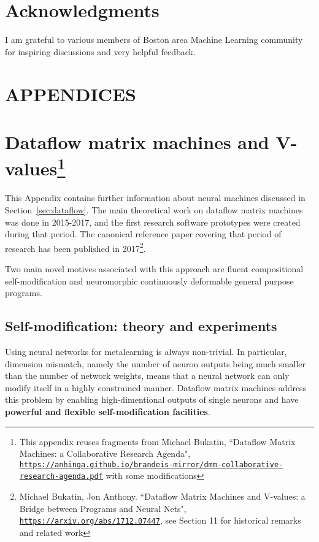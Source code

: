 \documentclass{article}
\begin{document}
\section*{Acknowledgments}

I am grateful to various members of Boston area Machine Learning community for inspiring discussions and very
helpful feedback.

\appendix

\section*{APPENDICES}

\section{Dataflow matrix machines and V-values\texorpdfstring{\protect\footnote{This
appendix reuses fragments from Michael Bukatin, ``Dataflow Matrix Machines: a Collaborative Research Agenda",
\href{https://anhinga.github.io/brandeis-mirror/dmm-collaborative-research-agenda.pdf}{\tt https://anhinga.github.io/brandeis-mirror/dmm-collaborative-research-agenda.pdf} 
with some modifications}}{}}\label{sec:dmms}

This Appendix contains further information about neural machines discussed in Section~\ref{sec:dataflow}.
The main theoretical work on dataflow matrix machines was done in 2015-2017, and the first research
software prototypes were created during that period. The canonical reference paper covering that
period of research has been published in 2017\footnote{Michael Bukatin, Jon Anthony.
``Dataflow Matrix Machines and V-values: a Bridge between Programs and Neural Nets",
\href{https://arxiv.org/abs/1712.07447}{\tt https://arxiv.org/abs/1712.07447}, see Section 11
for historical remarks and related work}.

Two main novel motives associated with this approach are fluent compositional self-modification and neuromorphic
continuously deformable general purpose programs.

\subsection{Self-modification: theory and experiments}\label{sec:dmm-self-mod}

Using neural networks for metalearning
is always non-trivial. In particular, dimension mismatch, namely the number of neuron outputs 
being much smaller than the number of network weights,
means that a neural network
can only modify itself in a highly constrained manner. Dataflow matrix machines address
this problem by enabling high-dimentional outputs of single neurons
 and have {\bf powerful and flexible self-modification facilities}.
\end{document}
